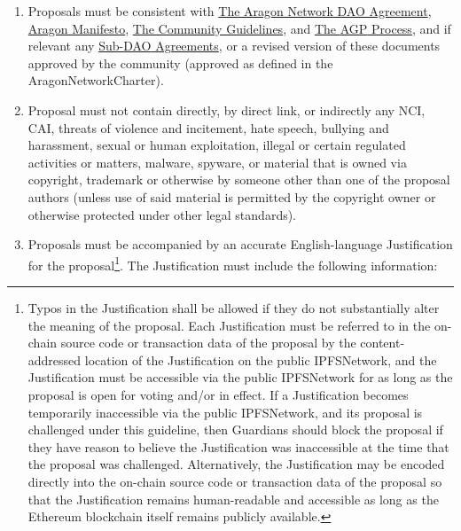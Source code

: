 \begin{enumerate}
\begin{enumerate}
		\begin{enumerate}
			\item Proposals must be consistent with  
			\hyperref[chap:ANDAOAgreement]{The Aragon Network DAO Agreement}, 
			\hyperref[chap:AragonManifesto]{Aragon Manifesto}, 
			\hyperref[chap:CommunityGuidelines]{The Community Guidelines}, and 
			\hyperref[chap:AGPProcess]{The \ac{AGP} Process}, and if relevant any 
			\hyperref[chap:SubDAOAgreements]{Sub-\ac{DAO} Agreements}, 
			or a revised version of these documents approved by the community (approved as defined in the \gls{AragonNetworkCharter}).
			\item Proposal must not contain directly, by direct link, or indirectly any \ac{NCI}, \ac{CAI},  threats of violence and incitement, hate speech, bullying and harassment, sexual or human exploitation, illegal or certain regulated activities or matters, malware, spyware, or material that is owned via copyright, trademark or otherwise by someone other than one of the proposal authors (unless use of said material is permitted by the copyright owner or otherwise protected under other legal standards).
			\item Proposals must be accompanied by an accurate English-language
			Justification for the proposal\footnote[1]{
				Typos in the Justification shall be allowed if they do not substantially alter the meaning of the proposal. 
				Each Justification must be referred to in the on-chain source code or transaction data of the proposal by the content-addressed location of the Justification on the public \gls{IPFSNetwork}, and the Justification must be accessible via the public \gls{IPFSNetwork} for as long as the proposal is open for voting and/or in effect. 
				If a Justification becomes temporarily inaccessible via the public \gls{IPFSNetwork}, and its proposal is challenged under this guideline, then \glspl{Guardian} should block the proposal if they have reason to believe the Justification was inaccessible at the time that the proposal was challenged. 
				Alternatively, the Justification may be encoded directly into the on-chain source code or transaction data of the proposal so that the Justification remains human-readable and accessible as long as the Ethereum blockchain itself remains publicly available.
			}. 
			The Justification must include the following information:
			

\end{enumerate}
\end{enumerate}
\end{enumerate}
